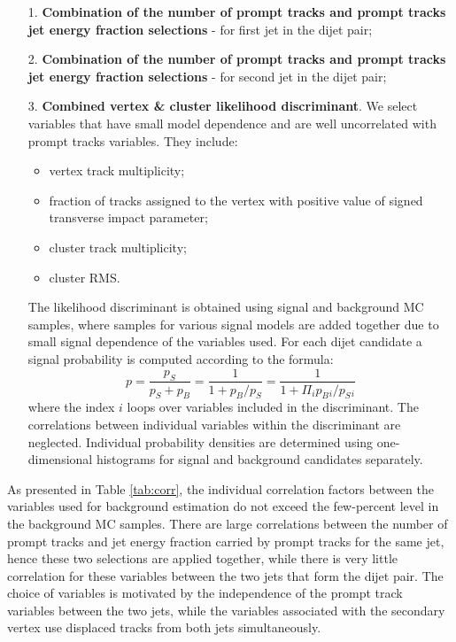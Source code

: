 \begin{itemize}     
\item[1.] {\bf Combination of the number of prompt tracks and prompt tracks jet energy fraction selections} - for first jet in the dijet pair;
\item[2.] {\bf Combination of the number of prompt tracks and prompt tracks jet energy fraction selections} - for second jet in the dijet pair;
\item[3.] {\bf Combined vertex \& cluster likelihood discriminant}. 
We select variables that have small model dependence and are 
well uncorrelated with prompt tracks variables. They include:
\begin{itemize}
 \item vertex track multiplicity;
 \item fraction of tracks assigned to the vertex with positive value of signed transverse impact parameter;
 \item cluster track multiplicity;
 \item cluster RMS.
\end{itemize}  
The likelihood discriminant is obtained using signal and background MC samples, where samples for
various signal models are added together due to small signal dependence of the variables used.
For each dijet candidate a signal probability is computed according to the formula:
\begin{equation}
p=\frac{p_S}{p_S+p_B}=\frac{1}{1+p_B/p_S}=\frac{1}{1+\Pi_i p_B{}_i/p_S{}_i}
\label{eqn:likelihood}
\end{equation}
where the index $i$ loops over variables included in the discriminant. The correlations between individual variables 
within the discriminant are
neglected. Individual probability densities are determined 
using one-dimensional histograms for signal and background candidates separately.
\end{itemize}

As presented in Table \ref{tab:corr}, the individual correlation factors between the variables used for background
estimation do not exceed the few-percent level in the background MC samples.
There are large correlations between the number of prompt tracks and jet energy fraction carried by prompt tracks 
for the same jet, hence these two selections are applied together, while there is very little correlation for these
variables between the two jets that form the dijet pair. The choice of variables is
motivated by the independence of the prompt track variables between the two jets,
 while the variables associated with the secondary vertex use displaced tracks
from both jets simultaneously.

